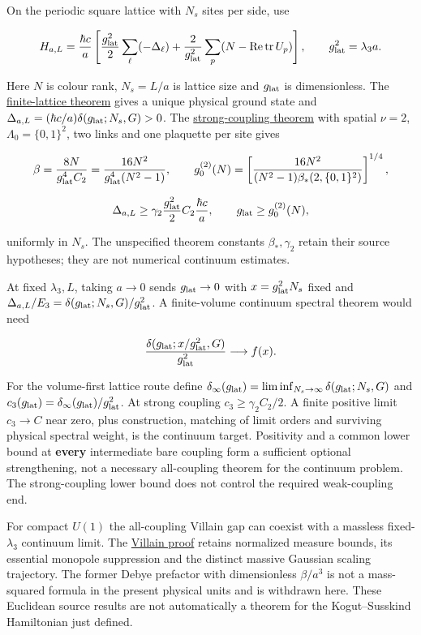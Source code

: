 \documentclass[11pt,a4paper]{article}
\begin{document}
On the periodic square lattice with \(N_s\) sites per side, use

\[H_{a,L}=\frac{\hbar c}{a}\left[
 \frac{g_{\rm lat}^2}{2}\sum_\ell(-\Delta_\ell)
 +\frac{2}{g_{\rm lat}^2}\sum_p
 (N-\operatorname{Re}\operatorname{tr}U_p)\right],
\qquad g_{\rm lat}^2=\lambda_3a.\]

Here \(N\) is colour rank, \(N_s=L/a\) is lattice size and
\(g_{\rm lat}\) is dimensionless. The
\href{mass-gap-obligations-lattice.md}{finite-lattice theorem} gives a
unique physical ground state and
\(\Delta_{a,L}=(\hbar c/a)\delta(g_{\rm lat};N_s,G)>0\). The
\href{strong-coupling-uniform-gap.md}{strong-coupling theorem} with
spatial \(\nu=2\), \(\Lambda_0=\{0,1\}^2\), two links and one plaquette
per site gives

\[\beta=\frac{8N}{g_{\rm lat}^4C_2}
 =\frac{16N^2}{g_{\rm lat}^4(N^2-1)},\qquad
 g_0^{(2)}(N)=\left[
 \frac{16N^2}{(N^2-1)\beta_*(2,\{0,1\}^2)}\right]^{1/4},\]

\[\Delta_{a,L}\ge\gamma_2\frac{g_{\rm lat}^2}{2}C_2\frac{\hbar c}{a},
\qquad g_{\rm lat}\ge g_0^{(2)}(N),\]

uniformly in \(N_s\). The unspecified theorem constants
\(\beta_*,\gamma_2\) retain their source hypotheses; they are not
numerical continuum estimates.

At fixed \(\lambda_3,L\), taking \(a\to0\) sends \(g_{\rm lat}\to0\)
with \(x=g_{\rm lat}^2N_s\) fixed and
\(\Delta_{a,L}/E_3=\delta(g_{\rm lat};N_s,G)/g_{\rm lat}^2\). A
finite-volume continuum spectral theorem would need

\[\frac{\delta(g_{\rm lat};x/g_{\rm lat}^2,G)}{g_{\rm lat}^2}\longrightarrow f(x).\]

For the volume-first lattice route define
\(\delta_\infty(g_{\rm lat})=\liminf_{N_s\to\infty}\delta(g_{\rm lat};N_s,G)\)
and \(c_3(g_{\rm lat})=\delta_\infty(g_{\rm lat})/g_{\rm lat}^2\). At
strong coupling \(c_3\ge\gamma_2C_2/2\). A finite positive limit
\(c_3\to C\) near zero, plus construction, matching of limit orders and
surviving physical spectral weight, is the continuum target. Positivity
and a common lower bound at \textbf{every} intermediate bare coupling
form a sufficient optional strengthening, not a necessary all-coupling
theorem for the continuum problem. The strong-coupling lower bound does
not control the required weak-coupling end.

For compact \(U(1)\) the all-coupling Villain gap can coexist with a
massless fixed-\(\lambda_3\) continuum limit. The
\href{villain-monopole-refinement.md}{Villain proof} retains normalized
measure bounds, its essential monopole suppression and the distinct
massive Gaussian scaling trajectory. The former Debye prefactor with
dimensionless \(\beta/a^3\) is not a mass-squared formula in the present
physical units and is withdrawn here. These Euclidean source results are
not automatically a theorem for the Kogut--Susskind Hamiltonian just
defined.
\end{document}
